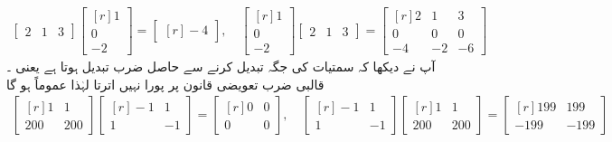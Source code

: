 \begin{align*}
\begin{bmatrix} 
2 & 1 & 3
\end{bmatrix}
\begin{bmatrix*}[r]
1\\
0\\
-2
\end{bmatrix*}=
\begin{bmatrix*}[r]
-4
\end{bmatrix*}, \quad
\begin{bmatrix*}[r]
1\\
0\\
-2
\end{bmatrix*}
\begin{bmatrix} 
2 & 1 & 3
\end{bmatrix}=
\begin{bmatrix*}[r]
2&1&3\\
0&0&0\\
-4&-2&-6
\end{bmatrix*}
\end{align*}
آپ نے دیکھا کہ سمتیات کی جگہ تبدیل کرنے سے حاصل ضرب تبدیل ہوتا ہے یعنی ۔
\quad قالبی ضرب تعویضی قانون پر پورا نہیں اترتا لہٰذا عموماً  ہو گا\\
\begin{align*}
\begin{bmatrix*}[r]
1&1\\
200&200
\end{bmatrix*}
\begin{bmatrix*}[r]
-1&1\\
1&-1
\end{bmatrix*}=
\begin{bmatrix*}[r]
0&0\\
0&0
\end{bmatrix*},\quad 
\begin{bmatrix*}[r]
-1&1\\
1&-1
\end{bmatrix*}
\begin{bmatrix*}[r]
1&1\\
200&200
\end{bmatrix*}
=
\begin{bmatrix*}[r]
199&199\\
-199&-199
\end{bmatrix*}
\end{align*}

